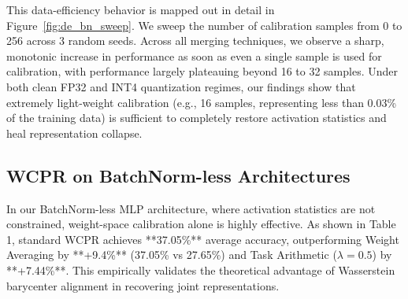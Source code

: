 \documentclass{article}
\theoremstyle{plain}
\theoremstyle{definition}
\theoremstyle{remark}
\begin{document}
This data-efficiency behavior is mapped out in detail in Figure~\ref{fig:de_bn_sweep}. We sweep the number of calibration samples from 0 to 256 across 3 random seeds. Across all merging techniques, we observe a sharp, monotonic increase in performance as soon as even a single sample is used for calibration, with performance largely plateauing beyond 16 to 32 samples. Under both clean FP32 and INT4 quantization regimes, our findings show that extremely light-weight calibration (e.g., 16 samples, representing less than 0.03\% of the training data) is sufficient to completely restore activation statistics and heal representation collapse.

\subsection{WCPR on BatchNorm-less Architectures}
In our BatchNorm-less MLP architecture, where activation statistics are not constrained, weight-space calibration alone is highly effective. As shown in Table 1, standard WCPR achieves **37.05\%** average accuracy, outperforming Weight Averaging by **+9.4\%** (37.05\% vs 27.65\%) and Task Arithmetic ($\lambda=0.5$) by **+7.44\%**. This empirically validates the theoretical advantage of Wasserstein barycenter alignment in recovering joint representations.
\end{document}
